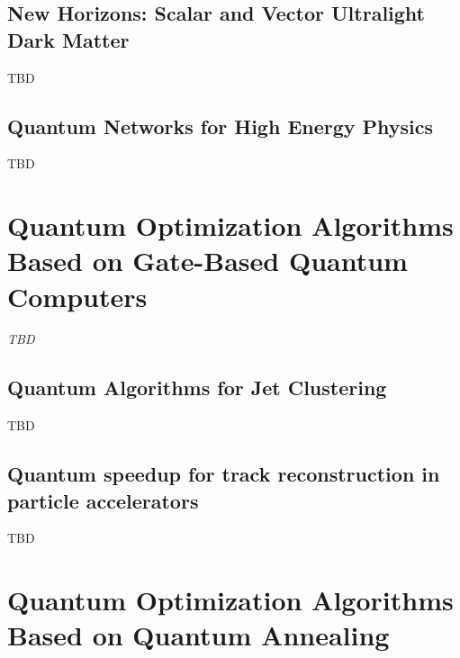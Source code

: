 \subsection{New Horizons: Scalar and Vector Ultralight Dark Matter~\cite{Antypas:2022asj}}
TBD
\subsection{Quantum Networks for High Energy Physics~\cite{Derevianko:2022lmn}}
TBD


\section{Quantum Optimization Algorithms Based on Gate-Based Quantum Computers}

\textit{TBD}

\subsection{Quantum Algorithms for Jet Clustering~\cite{Wei:2019rqy}}
TBD
\subsection{Quantum speedup for track reconstruction in particle accelerators~\cite{Magano:2021jzd}}
TBD


\section{Quantum Optimization Algorithms Based on Quantum Annealing}

